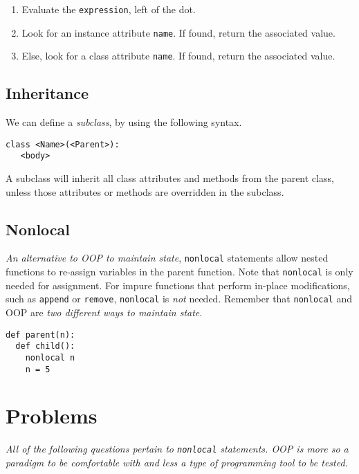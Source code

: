 \documentclass[a4paper]{book}
\begin{document}
\begin{enumerate}
\item Evaluate the {\tt expression}, left of the dot.
\item Look for an instance attribute {\tt name}. If found, return the associated value.
\item Else, look for a class attribute {\tt name}. If found, return the associated value.
\end{enumerate}

\subsection{Inheritance}

We can define a \textit{subclass}, by using the following syntax.

\begin{lstlisting}
class <Name>(<Parent>):
   <body>
\end{lstlisting}

A subclass will inherit all class attributes and methods from the parent class, unless those attributes or methods are overridden in the subclass.

\subsection{Nonlocal}

\textit{An alternative to OOP to maintain state}, {\tt nonlocal} statements allow nested functions to re-assign variables in the parent function. Note that {\tt nonlocal} is only needed for assignment. For impure functions that perform in-place modifications, such as {\tt append} or {\tt remove}, {\tt nonlocal} is \textit{not} needed. Remember that {\tt nonlocal} and OOP are \textit{two different ways to maintain state}.

\begin{lstlisting}
def parent(n):
  def child():
    nonlocal n
    n = 5
\end{lstlisting}

\section{Problems}

\textit{All of the following questions pertain to {\tt nonlocal} statements. OOP is more so a paradigm to be comfortable with and less a type of programming tool to be tested.}
\end{document}
